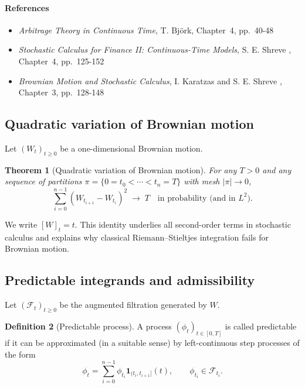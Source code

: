\documentclass[11pt]{article}
\newcommand{\1}{\mathbf{1}}
\theoremstyle{plain}
\newtheorem{theorem}{Theorem}[section]
\theoremstyle{definition}
\newtheorem{definition}[theorem]{Definition}
\theoremstyle{remark}
\begin{document}
\paragraph{References}

\begin{itemize}[leftmargin=1.4em]

\item \textit{Arbitrage Theory in Continuous Time}, T. Björk, Chapter~4, pp.~40-48

\item \textit{Stochastic Calculus for Finance II: Continuous-Time Models},  
S. E. Shreve  
, Chapter~4, pp.~125-152

\item \textit{Brownian Motion and Stochastic Calculus},  
I. Karatzas and S. E. Shreve  
, Chapter~3, pp.~128-148

\end{itemize}


\subsection{Quadratic variation of Brownian motion}

Let $(W_t)_{t\ge 0}$ be a one-dimensional Brownian motion.

\begin{theorem}[Quadratic variation of Brownian motion]
For any $T>0$ and any sequence of partitions
\(
\pi=\{0=t_0<\cdots<t_n=T\}
\)
with mesh $|\pi|\to 0$,
\[
\sum_{i=0}^{n-1} (W_{t_{i+1}}-W_{t_i})^2
\;\longrightarrow\;
T
\quad \text{in probability (and in }L^2\text{)}.
\]
\end{theorem}

We write $[W]_t = t$.  
This identity underlies all second-order terms in stochastic calculus and explains why classical Riemann--Stieltjes integration fails for Brownian motion.

\subsection{Predictable integrands and admissibility}

Let $(\mathcal F_t)_{t\ge0}$ be the augmented filtration generated by $W$.

\begin{definition}[Predictable process]
A process $(\phi_t)_{t\in[0,T]}$ is called predictable if it can be approximated (in a suitable sense) by left-continuous step processes of the form
\[
\phi_t = \sum_{i=0}^{n-1} \phi_{t_i}\mathbf 1_{(t_i,t_{i+1}]}(t),
\qquad \phi_{t_i}\in\mathcal F_{t_i}.
\]
\end{definition}
\end{document}
